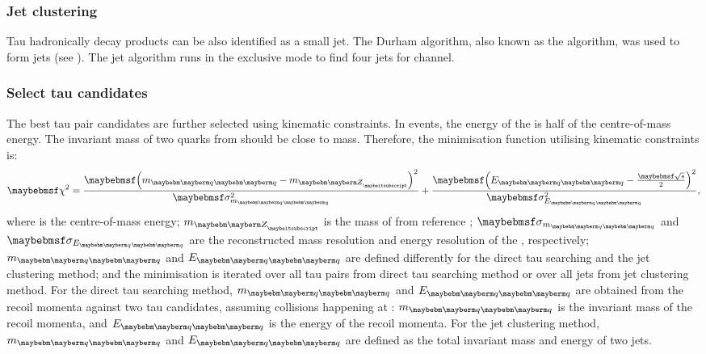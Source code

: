 \subsubsection{Jet clustering}

Tau hadronically decay products can be also identified as a small jet. The Durham algorithm, also known as the \ee \kt algorithm, was used to form  jets (see ). The jet algorithm runs in the exclusive mode to find four jets for \eeZZQQ channel.

\subsubsection{Select tau candidates}

The best tau pair candidates are further selected using kinematic constraints. In  \HepProcess{\Pep \Pem \to \PZ \PZ} events, the energy of the \PZ is half of the centre-of-mass energy. The invariant mass of two quarks from \PZ should be close to \PZ mass. Therefore, the minimisation function utilising kinematic constraints is:
\begin{equation}
\chi^2 = \frac{\parenths{m_{\Pquark\Pquark} - m_{\PZ}}^2}{\sigma_{m_{\Pquark\Pquark}}^2} + \frac{\parenths{E_{\Pquark\Pquark} - \frac{\sqrtS}{2}}^2}{\sigma_{E_{\Pquark\Pquark}}^2},
\label{eq:tauMinimiser}
\end{equation}
where \sqrtS is the centre-of-mass energy; $m_{\PZ}$ is the mass of \PZ from reference \cite{Agashe:2014kda}; $\sigma_{m_{\Pquark\Pquark}}$ and $\sigma_{E_{\Pquark\Pquark}}$ are the reconstructed mass resolution  and energy resolution of the \ZToqq, respectively;  $m_{\Pquark\Pquark}$ and  $E_{\Pquark\Pquark}$ are defined differently for the direct tau searching and the jet clustering method; and the minimisation is iterated over all tau pairs from direct tau searching method or over all jets from jet clustering method. For the direct tau searching method, $m_{\Pquark\Pquark}$ and  $E_{\Pquark\Pquark}$ are obtained from the recoil momenta against two tau candidates, assuming collisions happening at \sqrtS: $m_{\Pquark\Pquark}$ is the invariant mass of the recoil momenta, and   $E_{\Pquark\Pquark}$ is the energy of the recoil momenta. For the jet clustering method,  $m_{\Pquark\Pquark}$ and  $E_{\Pquark\Pquark}$ are defined as the total invariant mass and energy of two jets.

